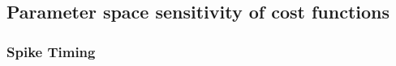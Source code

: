 % 
% 
% 
% 
% 
% 
% 
% 
% 


\subsection{Parameter space sensitivity of cost functions}


\subsubsection{Spike Timing}
